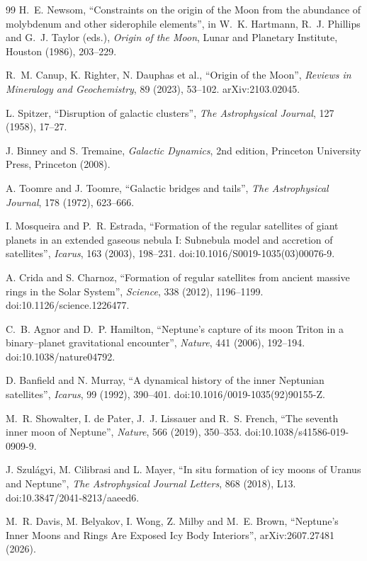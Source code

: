 \documentclass[11pt,a4paper,openany]{report}
\begin{document}
\begin{thebibliography}{99}
 H.~E. Newsom, ``Constraints on the origin of the Moon from the abundance of
molybdenum and other siderophile elements'', in W.~K. Hartmann, R.~J. Phillips and G.~J. Taylor
(eds.), \emph{Origin of the Moon}, Lunar and Planetary Institute, Houston (1986), 203--229.

 R.~M. Canup, K. Righter, N. Dauphas et al., ``Origin of the Moon'',
\emph{Reviews in Mineralogy and Geochemistry}, 89 (2023), 53--102. arXiv:2103.02045.

 L. Spitzer, ``Disruption of galactic clusters'', \emph{The Astrophysical
Journal}, 127 (1958), 17--27.

 J. Binney and S. Tremaine, \emph{Galactic Dynamics}, 2nd edition,
Princeton University Press, Princeton (2008).

 A. Toomre and J. Toomre, ``Galactic bridges and tails'', \emph{The
Astrophysical Journal}, 178 (1972), 623--666.


 I. Mosqueira and P.~R. Estrada, ``Formation of the regular
satellites of giant planets in an extended gaseous nebula I: Subnebula model and accretion of
satellites'', \emph{Icarus}, 163 (2003), 198--231. doi:10.1016/S0019-1035(03)00076-9.

 A. Crida and S. Charnoz, ``Formation of regular satellites from ancient
massive rings in the Solar System'', \emph{Science}, 338 (2012), 1196--1199.
doi:10.1126/science.1226477.

 C.~B. Agnor and D.~P. Hamilton, ``Neptune's capture of its moon Triton
in a binary--planet gravitational encounter'', \emph{Nature}, 441 (2006), 192--194.
doi:10.1038/nature04792.

 D. Banfield and N. Murray, ``A dynamical history of the inner
Neptunian satellites'', \emph{Icarus}, 99 (1992), 390--401.
doi:10.1016/0019-1035(92)90155-Z.

 M.~R. Showalter, I. de Pater, J.~J. Lissauer and R.~S. French, ``The
seventh inner moon of Neptune'', \emph{Nature}, 566 (2019), 350--353.
doi:10.1038/s41586-019-0909-9.

 J. Szulágyi, M. Cilibrasi and L. Mayer, ``In situ formation of icy moons of
Uranus and Neptune'', \emph{The Astrophysical Journal Letters}, 868 (2018), L13.
doi:10.3847/2041-8213/aaeed6.

 M.~R. Davis, M. Belyakov, I. Wong, Z. Milby and M.~E. Brown, ``Neptune's Inner
Moons and Rings Are Exposed Icy Body Interiors'', arXiv:2607.27481 (2026).



\end{thebibliography}
\end{document}
